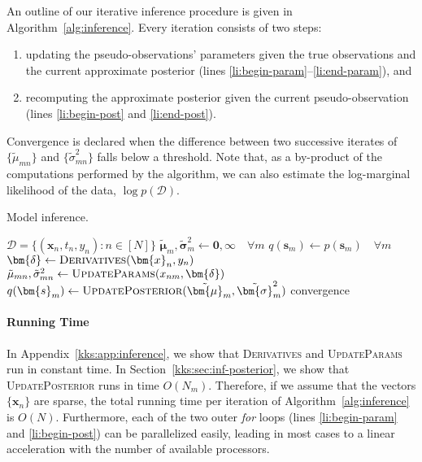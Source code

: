 An outline of our iterative inference procedure is given in Algorithm~\ref{alg:inference}.
Every iteration consists of two steps:
\begin{enumerate}
\item updating the pseudo-observations' parameters given the true observations and the current approximate posterior (lines \ref{li:begin-param}--\ref{li:end-param}), and
\item recomputing the approximate posterior given the current pseudo-observation (lines \ref{li:begin-post} and \ref{li:end-post}).
\end{enumerate}
Convergence is declared when the difference between two successive iterates of $\{ \tilde{\mu}_{mn} \}$ and $\{ \tilde{\sigma}_{mn}^2 \}$ falls below a threshold.
Note that, as a by-product of the computations performed by the algorithm, we can also estimate the log-marginal likelihood of the data, $\log p(\mathcal{D})$.

\begin{algorithm}[t]
  \caption{Model inference.}
  \label{alg:inference}
  \begin{algorithmic}[1]
    \Require $\mathcal{D} = \{ (\bm{x}_n, t_n, y_n) : n \in [N] \}$
    \State $\tilde{\bm{\mu}}_m, \tilde{\bm{\sigma}}^2_m \gets \bm{0}, \bm{\infty} \quad \forall m$
    \State $q(\bm{s}_m) \gets p(\bm{s}_m) \quad \forall m$
    \Repeat
        \label{li:begin-param}
        \State $\bm{\delta} \gets \textsc{Derivatives}(\bm{x}_n, y_n)$ \label{li:derivatives}
          \State $\tilde{\mu}_{mn}, \tilde{\sigma}^2_{mn} \gets \textsc{UpdateParams}(x_{nm}, \bm{\delta})$ \label{li:updateparams}
        \EndFor
      \EndFor \label{li:end-param}
       \label{li:begin-post}
        \State $q(\bm{s}_m) \gets \textsc{UpdatePosterior}(\tilde{\bm{\mu}}_m, \tilde{\bm{\sigma}}^2_m)$ \label{li:updateposterior}
      \EndFor \label{li:end-post}
    \Until convergence
  \end{algorithmic}
\end{algorithm}

\paragraph{Running Time}
In Appendix~\ref{kks:app:inference}, we show that \textsc{Derivatives} and \textsc{UpdateParams} run in constant time.
In Section~\ref{kks:sec:inf-posterior}, we show that \textsc{UpdatePosterior} runs in time $O(N_m)$.
Therefore, if we assume that the vectors $\{ \bm{x}_n \}$ are sparse, the total running time per iteration of Algorithm~\ref{alg:inference} is $O(N)$.
Furthermore, each of the two outer \emph{for} loops (lines \ref{li:begin-param} and \ref{li:begin-post}) can be parallelized easily, leading in most cases to a linear acceleration with the number of available processors.


